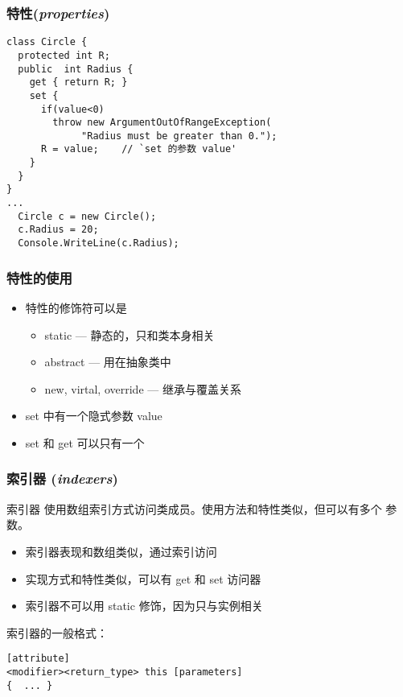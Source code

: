 \begin{frame}[fragile]
\frametitle{特性(\textit{properties})}
\begin{lstlisting}[escapeinside=`']
class Circle {
  protected int R;
  public  int Radius {
    get { return R; }
    set {
      if(value<0)
        throw new ArgumentOutOfRangeException(
             "Radius must be greater than 0.");
      R = value;    // `set 的参数 value'
    }
  }
}
...
  Circle c = new Circle();
  c.Radius = 20;
  Console.WriteLine(c.Radius);

\end{lstlisting}
\end{frame}

\begin{frame}
\frametitle{特性的使用}
\begin{itemize}
\setlength{\itemsep}{8pt plus 1pt}
\item 特性的修饰符可以是
  \begin{itemize}
  \item static --- 静态的，只和类本身相关
  \item abstract --- 用在抽象类中
  \item new, virtal, override --- 继承与覆盖关系
  \end{itemize}
\item set 中有一个隐式参数 value
\item set 和 get 可以只有一个
\end{itemize}
\end{frame}


\begin{frame}[fragile]
\frametitle{索引器 (\textit{indexers})}

\begin{block}{索引器}
\CJKindent \small 使用数组索引方式访问类成员。使用方法和特性类似，但可以有多个
参数。
\end{block}
\begin{itemize}
\item 索引器表现和数组类似，通过索引访问
\item 实现方式和特性类似，可以有 get 和 set 访问器
\item 索引器不可以用 static 修饰，因为只与实例相关
\end{itemize}

索引器的一般格式：
\begin{lstlisting}
[attribute]
<modifier><return_type> this [parameters]
{  ... }
\end{lstlisting}

\end{frame}

